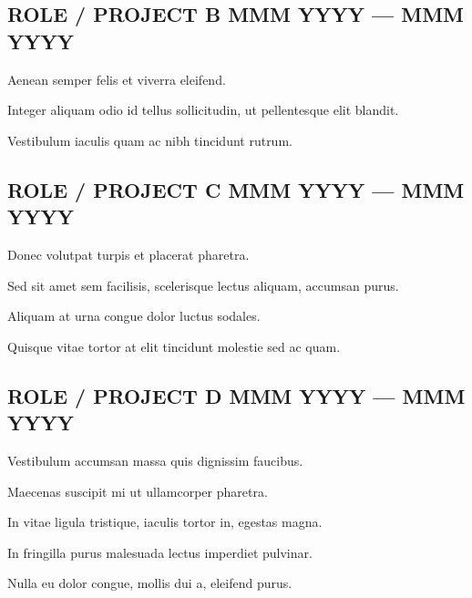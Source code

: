 \subsection{{ROLE / PROJECT B \hfill MMM YYYY --- MMM YYYY}}
\begin{zitemize}
\item Aenean semper felis et viverra eleifend.
\item Integer aliquam odio id tellus sollicitudin, ut pellentesque elit blandit.
\item Vestibulum iaculis quam ac nibh tincidunt rutrum.
\end{zitemize}

\subsection{{ROLE / PROJECT C \hfill MMM YYYY --- MMM YYYY}}
\begin{zitemize}
\item Donec volutpat turpis et placerat pharetra.
\item Sed sit amet sem facilisis, scelerisque lectus aliquam, accumsan purus.
\item Aliquam at urna congue dolor luctus sodales.
\item Quisque vitae tortor at elit tincidunt molestie sed ac quam.
\end{zitemize}

\subsection{{ROLE / PROJECT D \hfill MMM YYYY --- MMM YYYY}}
\begin{zitemize}
\item Vestibulum accumsan massa quis dignissim faucibus.
\item Maecenas suscipit mi ut ullamcorper pharetra.
\item In vitae ligula tristique, iaculis tortor in, egestas magna.
\item In fringilla purus malesuada lectus imperdiet pulvinar.
\item Nulla eu dolor congue, mollis dui a, eleifend purus.
\end{zitemize}

